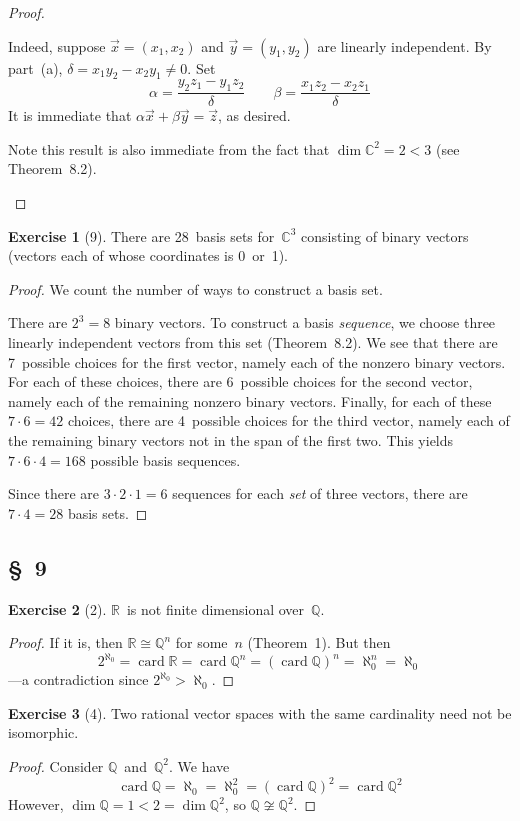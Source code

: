 \documentclass[letterpaper,12pt]{article}
\newcommand{\Q}{\mathbb{Q}}
\newcommand{\R}{\mathbb{R}}
\newcommand{\C}{\mathbb{C}}
\newcommand{\iso}{\cong}
\DeclareMathOperator{\card}{card}
\theoremstyle{definition}
\newtheorem*{exer}{Exercise}
\theoremstyle{remark}
\theoremstyle{direction}
\begin{document}
\begin{proof}
\begin{enumerate}
Indeed, suppose \(\vec{x}=(x_1,x_2)\) and \(\vec{y}=(y_1,y_2)\) are linearly independent. By part~(a), \(\delta=x_1y_2-x_2y_1\ne0\). Set
\[
\alpha=\frac{y_2z_1-y_1z_2}{\delta}
\qquad
\beta=\frac{x_1z_2-x_2z_1}{\delta}
\]
It is immediate that \(\alpha\vec{x}+\beta\vec{y}=\vec{z}\), as desired.

Note this result is also immediate from the fact that \(\dim\C^2=2<3\) (see Theorem~8.2).\qedhere
\end{enumerate}
\end{proof}
\begin{exer}[9]
There are 28~basis sets for~\(\C^3\) consisting of binary vectors (vectors each of whose coordinates is 0~or~1).
\end{exer}
\begin{proof}
We count the number of ways to construct a basis set.

There are \(2^3=8\) binary vectors. To construct a basis \emph{sequence}, we choose three linearly independent vectors from this set (Theorem~8.2). We see that there are 7~possible choices for the first vector, namely each of the nonzero binary vectors. For each of these choices, there are 6~possible choices for the second vector, namely each of the remaining nonzero binary vectors. Finally, for each of these \(7\cdot6=42\) choices, there are 4~possible choices for the third vector, namely each of the remaining binary vectors not in the span of the first two. This yields \(7\cdot6\cdot4=168\) possible basis sequences.

Since there are \(3\cdot2\cdot1=6\) sequences for each \emph{set} of three vectors, there are \(7\cdot4=28\) basis sets.
\end{proof}
\subsection*{\S~9}
\begin{exer}[2]
\(\R\)~is not finite dimensional over~\(\Q\).
\end{exer}
\begin{proof}
If it is, then \(\R\iso\Q^n\) for some~\(n\) (Theorem~1). But then
\[2^{\aleph_0}=\card\R=\card\Q^n=(\card\Q)^n=\aleph_0^n=\aleph_0\]
---a contradiction since \(2^{\aleph_0}>\aleph_0\).
\end{proof}
\begin{exer}[4]
Two rational vector spaces with the same cardinality need not be isomorphic.
\end{exer}
\begin{proof}
Consider \(\Q\)~and~\(\Q^2\). We have
\[\card{\Q}=\aleph_0=\aleph_0^2=(\card\Q)^2=\card\Q^2\]
However, \(\dim\Q=1<2=\dim\Q^2\), so \(\Q\not\iso\Q^2\).
\end{proof}
\end{document}
